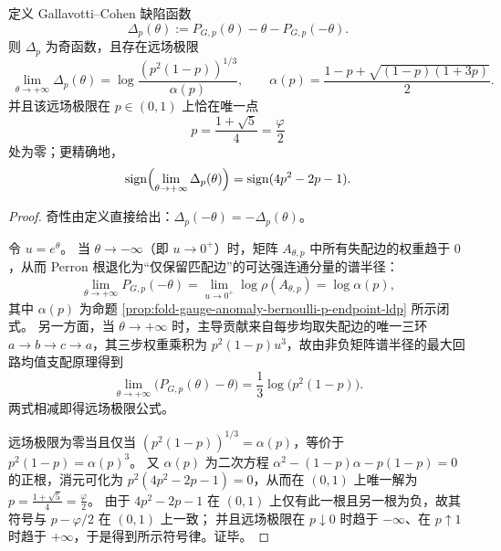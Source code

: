 \begin{proposition}\label{prop:fold-gauge-anomaly-bernoulli-p-gc-defect-farfield-critical}
定义 Gallavotti--Cohen 缺陷函数
\[
\Delta_p(\theta):=P_{G,p}(\theta)-\theta-P_{G,p}(-\theta).
\]
则 \(\Delta_p\) 为奇函数，且存在远场极限
\[
\boxed{\;
\lim_{\theta\to+\infty}\Delta_p(\theta)=
\log\frac{(p^2(1-p))^{1/3}}{\alpha(p)},
\qquad
\alpha(p)=\frac{1-p+\sqrt{(1-p)(1+3p)}}{2}.
\;}
\]
并且该远场极限在 \(p\in(0,1)\) 上恰在唯一点
\[
\boxed{\;p=\frac{1+\sqrt5}{4}=\frac{\varphi}{2}\;}
\]
处为零；更精确地，
\[
\operatorname{sign}\Bigl(\lim_{\theta\to+\infty}\Delta_p(\theta)\Bigr)=\operatorname{sign}(4p^2-2p-1).
\]
\end{proposition}
\begin{proof}
奇性由定义直接给出：\(\Delta_p(-\theta)=-\Delta_p(\theta)\)。
\par
令 \(u=e^\theta\)。
当 \(\theta\to-\infty\)（即 \(u\to 0^+\)）时，矩阵 \(A_{\theta,p}\) 中所有失配边的权重趋于 \(0\)，从而 Perron 根退化为“仅保留匹配边”的可达强连通分量的谱半径：
\[
\lim_{\theta\to+\infty}P_{G,p}(-\theta)=\lim_{u\to 0^+}\log\rho(A_{\theta,p})=\log\alpha(p),
\]
其中 \(\alpha(p)\) 为命题 \ref{prop:fold-gauge-anomaly-bernoulli-p-endpoint-ldp} 所示闭式。
另一方面，当 \(\theta\to+\infty\) 时，主导贡献来自每步均取失配边的唯一三环 \(a\to b\to c\to a\)，其三步权重乘积为 \(p^2(1-p)u^3\)，故由非负矩阵谱半径的最大回路均值支配原理得到
\[
\lim_{\theta\to+\infty}\bigl(P_{G,p}(\theta)-\theta\bigr)=\frac13\log\bigl(p^2(1-p)\bigr).
\]
两式相减即得远场极限公式。
\par
远场极限为零当且仅当 \((p^2(1-p))^{1/3}=\alpha(p)\)，等价于 \(p^2(1-p)=\alpha(p)^3\)。
又 \(\alpha(p)\) 为二次方程 \(\alpha^2-(1-p)\alpha-p(1-p)=0\) 的正根，消元可化为 \(p^2(4p^2-2p-1)=0\)，从而在 \((0,1)\) 上唯一解为 \(p=\frac{1+\sqrt5}{4}=\frac{\varphi}{2}\)。
由于 \(4p^2-2p-1\) 在 \((0,1)\) 上仅有此一根且另一根为负，故其符号与 \(p-\varphi/2\) 在 \((0,1)\) 上一致；
并且远场极限在 \(p\downarrow 0\) 时趋于 \(-\infty\)、在 \(p\uparrow 1\) 时趋于 \(+\infty\)，于是得到所示符号律。证毕。
\end{proof}



